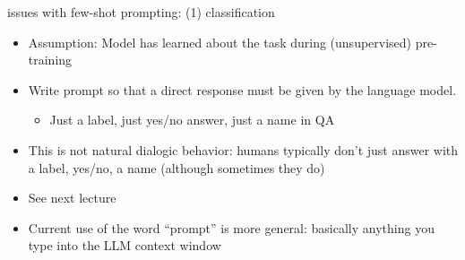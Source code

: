 \begin{frame}{issues with few-shot prompting: (1) classification}

\vfill

\begin{itemize}
    \item Assumption: Model has learned about the task during (unsupervised) pre-training 
    \item Write prompt so that  a direct response must be
    given by the language model.
\begin{itemize}
        \item Just a label, just yes/no answer, just a name
    in QA
\end{itemize}
    \item This is not natural dialogic behavior: humans
    typically don't
    just answer with a label, yes/no, a name (although
    sometimes they do)
    \item See next lecture
\item Current use of the word ``prompt'' is more general: basically
anything you type into the LLM context window

\end{itemize}

\vfill

\end{frame}


